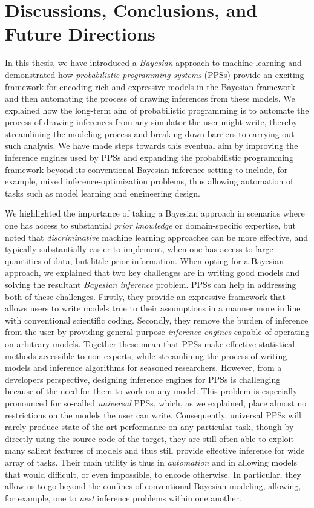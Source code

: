 
\chapter{Discussions, Conclusions, and Future Directions}
\label{chp:discussion}

In this thesis, we have introduced a \emph{Bayesian} approach to machine learning and demonstrated
how \emph{probabilistic programming systems} (PPSs) provide an exciting framework for
encoding rich and expressive models in the Bayesian framework and then automating the process
of drawing inferences from these models.  We explained how the 
long-term
aim of probabilistic programming is to automate the process of drawing inferences from any simulator
the user might write, thereby streamlining the modeling process and breaking down barriers to carrying out such
analysis.  We have made steps towards this eventual aim by improving the inference
engines used by PPSs and expanding the probabilistic programming framework beyond its conventional
Bayesian inference setting to include, for example, 
mixed inference-optimization problems, thus
allowing automation of tasks such as model learning and engineering design.

We highlighted the importance of taking a Bayesian approach in scenarios where one has
access to substantial \emph{prior knowledge} or domain-specific expertise, but noted that
\emph{discriminative} machine learning approaches can be more effective, and typically substantially
easier to implement, when one has access to large quantities of data, but little prior information.
When opting for a Bayesian approach, we explained that two key challenges are in writing good models
and solving the resultant \emph{Bayesian inference} problem.
PPSs can help in addressing both of these challenges.  Firstly, they provide an expressive framework
that allows users to write models true to their assumptions in a manner more in line with conventional
scientific coding.  Secondly, they remove the burden of inference from the user by providing general
purpose \emph{inference engines} capable of operating on arbitrary models.
Together these mean that PPSs make effective statistical methods accessible to non-experts, while
streamlining the process of writing models and inference algorithms for seasoned researchers.
However, from a developers perspective, designing inference engines for PPSs is challenging because of
 the need for them to work on any model.
 This problem is especially pronounced
for so-called \emph{universal} PPSs, which, as we explained, place almost no restrictions on the
models the user can write.  Consequently,
universal PPSs will rarely produce state-of-the-art performance on any particular task, though
by directly using the source code of the target, they are still often able to exploit many salient
features of models and thus still provide effective inference for wide array of tasks.
  Their main
utility is thus in \emph{automation} and in allowing models that would difficult, or even impossible,
to encode otherwise.  In particular, they allow us to go beyond
the confines of conventional Bayesian  modeling, allowing, for example, one to \emph{nest} 
inference problems within one another.

